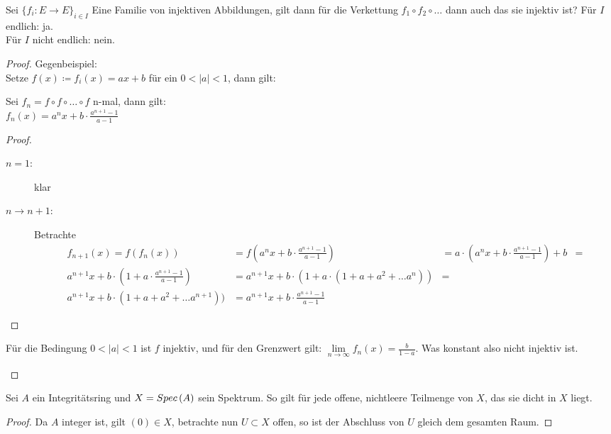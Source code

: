 \documentclass[ngerman, parskip=half, titlepage=false]{scrartcl}
\begin{document}
\begin{Auf}
  Sei $\{ f_i : E \rightarrow E \}_{i \in I}$ Eine Familie von
  injektiven Abbildungen, gilt dann für die Verkettung
  $ f_1 \circ f_2 \circ \ldots$ dann auch das sie injektiv ist?
  Für $I$ endlich: ja.\\
  Für $I$ nicht endlich: nein.
  \begin{proof}
    Gegenbeispiel:\\ Setze $f(x) \coloneqq f_i (x) = ax+b$ für ein
    $0 < |a| < 1$, dann gilt:
    \begin{Beh}
      Sei $f_n = f \circ f \circ \ldots \circ f$ n-mal, dann gilt:\\
      $f_n(x) = a^n x + b \cdot \frac{a^{n+1} -1}{a-1}$
      \begin{proof}
        \begin{description}
        \item[$n=1$:] klar
        \item[$n \rightarrow n+1$:] Betrachte\\
          \begin{align*}
            f_{n+1}(x) = f(f_n(x)) 
          &= 
            f(a^n x + b \cdot \frac{a^{n+1}-1}{a-1}) 
          &= 
            a \cdot \left( a^n x + b \cdot \frac{a^{n+1}-1}{a-1} \right) + b        
          &= \\
            a^{n+1} x + b \cdot ( 1 + a \cdot \frac{a^{n+1}-1}{a-1})
          &= 
            a^{n+1} x + b \cdot (1 + a \cdot (1 + a + a^2 + \ldots a^{n}))
          &= \\
            a^{n+1} x + b \cdot (1  + a + a^2 + \ldots a^{n+1}))
          &= 
            a^{n+1} x + b \cdot \frac{a^{n+1}-1}{a-1}
          \end{align*}
        \end{description}
        \end{proof}
        Für die Bedingung $0 < |a| < 1$ ist $f$ injektiv, und für den
        Grenzwert gilt: $\lim\limits_{n \rightarrow \infty} f_n(x) = \frac{b}{1-a}$.
        Was konstant also nicht injektiv ist.
    \end{Beh}
  \end{proof}
\end{Auf}

\begin{Beh}
  Sei $A$ ein Integritätsring und $X = Spec \left( A \right)$ sein Spektrum. So gilt für jede
  offene, nichtleere Teilmenge von $X$, das sie dicht in $X$ liegt.
  \begin{proof}
    Da $A$ integer ist, gilt $(0) \in X$, betrachte nun $U \subset X$ offen, so 
    ist der Abschluss von $U$ gleich dem gesamten Raum.
  \end{proof}
\end{Beh}
\end{document}
